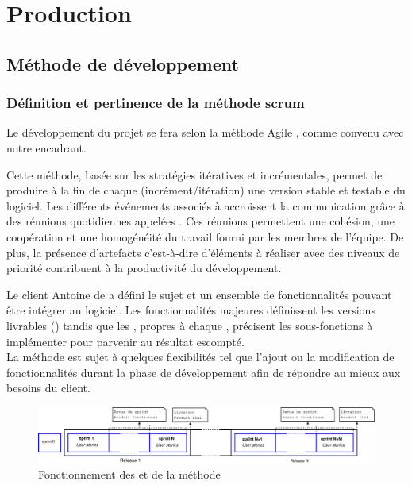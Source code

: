 \chapter{Production}
\section{Méthode de développement}
\subsection{Définition et pertinence de la méthode scrum}
Le développement du projet se fera selon la méthode Agile , comme convenu avec notre encadrant.

Cette méthode, basée sur les stratégies itératives et incrémentales, permet de produire à la fin de chaque  (incrément/itération) une version stable et testable du logiciel. Les différents événements associés à  accroissent la communication grâce à des réunions quotidiennes appelées . Ces réunions permettent une cohésion, une coopération et une homogénéité du travail fourni par les membres de l'équipe. De plus, la présence d'artefacts c'est-à-dire d'éléments à réaliser avec des niveaux de priorité contribuent à la productivité du développement.
 
Le client Antoine de  a défini le sujet et un ensemble de fonctionnalités pouvant être intégrer au logiciel. Les fonctionnalités majeures définissent les versions livrables () tandis que les , propres à chaque , précisent les sous-fonctions à implémenter pour parvenir au résultat escompté. \\
La méthode  est sujet à quelques flexibilités tel que l'ajout ou la modification de fonctionnalités durant la phase de développement afin de répondre au mieux aux besoins du client.  

\begin{figure}[H]
	\centering
	\includegraphics[width=18cm]{screens/scrum.eps}
	\caption{Fonctionnement des  et  de la méthode }
\end{figure}


